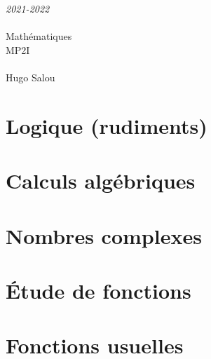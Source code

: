 \documentclass[a4paper,oneside]{book}
\newcommand{\chap}[2][0]{
	\setcounter{chapter}{#1 - 1}
	\chapter{#2}
	\renewcommand*\parttitle{#2}
}
\renewcommand{\headrulewidth}{0pt}
\begin{document}
	\begin{titlepage}
		\begin{center}
			\vspace{10cm}
			{\Large \itshape 2021-2022}\\
			\vspace{3cm}
			\\
			\vspace{2mm}
			\vspace{0.5cm}
			{\HUGE Mathématiques}\\
			\vspace{0.5cm}
			{\fontsize{240pt}{260pt}\selectfont MP2I}\\
			\vspace{0.5cm}
			\\
			\vfill
			Hugo {\sc Salou}\\
		\end{center}
	\end{titlepage}

	\renewcommand{\headrulewidth}{0pt}
	\fancyhead{}
	\fancyfoot{}
	\fancyfoot[C]{--\:\thepage\:--}

	\frontmatter
	\tableofcontents

	\mainmatter
	\renewcommand{\headrulewidth}{0.4pt}
	\fancyhead[C]{\parttitle}

	{
		\chap[00]{Logique (rudiments)}
		\renewcommand{\cwd}{../chap00}
		
		
		
		
		
	}

	{
		\chap[01]{Calculs algébriques}
		\renewcommand{\cwd}{../chap01}
		
		
		
		
		
		
	}

	{
		\chap[02]{Nombres complexes}
		\renewcommand{\cwd}{../chap02}
		
		
		
		
		
	}

	{
		\chap[03]{Étude de fonctions}
		\renewcommand{\cwd}{../chap03}
		
		
		
	}

	{
		\chap[04]{Fonctions usuelles}
		\renewcommand{\cwd}{../chap04}
		
		
		
		
		
		
		
	}
\end{document}
